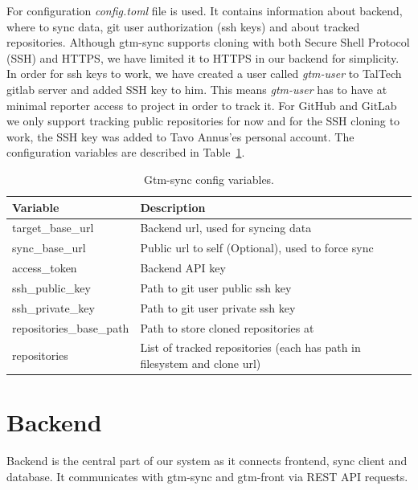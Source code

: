 For configuration \textit{config.toml} file is used.
It contains information about backend, where to sync data, git user authorization (ssh keys) and about tracked repositories.
Although gtm-sync supports cloning with both Secure Shell Protocol (SSH) and HTTPS, we have limited it to HTTPS in our backend for simplicity.
In order for ssh keys to work, we have created a user called \textit{gtm-user} to TalTech gitlab server and added SSH key to him.
This means \textit{gtm-user} has to have at minimal reporter access to project in order to track it.
For GitHub and GitLab we only support tracking public repositories for now and for the SSH cloning to work, the SSH key was added to
Tavo Annus'es personal account.
The configuration variables are described in Table~\ref{tab:gtm-sync-config}.

\begin{table}[H]
    \centering
    \begin{tabular}{ | p{6cm} | p{6cm} |}
        \hline
        Variable & Description\\
        \hline
        target\_base\_url & Backend url, used for syncing data \\
        \hline
        sync\_base\_url &  Public url to self (Optional), used to force sync\\
        \hline
        access\_token & Backend API key\\
        \hline
        ssh\_public\_key & Path to git user public ssh key\\
        \hline
        ssh\_private\_key & Path to git user private ssh key\\
        \hline
        repositories\_base\_path & Path to store cloned repositories at\\
        \hline
        repositories & List of tracked repositories (each has path in filesystem and clone url)\\
        \hline
    \end{tabular}
    \caption{Gtm-sync config variables.}
    \label{tab:gtm-sync-config}
\end{table}

\section{Backend}\label{sec:backend-content}
Backend is the central part of our system as it connects frontend, sync client and database.
It communicates with gtm-sync and gtm-front via REST API requests.

